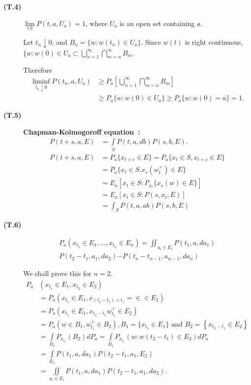 \begin{description}
\item[{\bf (T.4)}] $\lim\limits_{t\ 0} P(t, a, U_a) =1$, where $U_a$ is an
  open set containing $a$. 

Let $t_n \downarrow 0$, and $B_n = \{  w :  w (t_n) \in U_a\}$. Since
$w(t)$ is right continuous, $\{ w : w(0) \in  U_a \subset
\bigcup\limits_{n=1}^\infty \bigcap\limits_{m=n}^\infty B_m$.  

Therefore 
\begin{align*}
  \liminf\limits_{t_n \downarrow 0} P(t_n, a, U_a) & \ge P_a \left[
    \bigcup\limits^\infty_{n=1} \bigcap\limits_{m=n}^\infty B_m\right]\\
  & \ge P_a \{ w :  w(0) \in U_a\} \ge P_a \{ w : w(0) =a \} =1.
\end{align*}

\item[{\bf (T.5)}] \textbf{Chapman-Kolmogoroff equation~:}
\begin{align*}
    P(t+s, a,E) & = \int\limits_S P(t,a, db) P (s,b,E).\\
    P(t+s,a,E) &= P_a \{ x_{t+s} \in E \}= P_a \{ x_t \in S, x_{t+s} \in E \} \\
    & = P_a \{ x_t \in S. x_s (w^+_t) \in E \} \\
    &=E_a [ x_t \in S :   P_{x_t} \{  x_s (w) \in E \} ] \\
    &= E_a [x_t \in S :  P(s,x_t, E)] \\
    &= \int_S P(t,a,ab) P(s,b,E)
  \end{align*}\pageoriginale

\item[{\bf (T.6)}] 
  \begin{multline*}
    P_a ( x_{t_1} \in E_1, \ldots , x_{t_n} \in E_n)
    = \iint_{a_i \in E_{i}} P (t_1, a, da_1)\\ 
    P (t_2- t_1, a_1, da_2)
    \cdots P(t_n -t_{n-1},a_{n-1}, da_n) 
  \end{multline*}

We shall prove this for $n=2$.
\begin{align*}
  P_a & (x_{t_1} \in  E_1, x_{t_2} \in E_2)\\ 
  & = P_a (x_{t_1} \in E_1,
  x_{(t_{2} -t_1)+t_{1}}=\in \in E_2) \\
  &= P_a (x_{t_1} \in E_1, x_{t_{2}-t_1} w^+_{t_1}\in E_2)\\
  &= P_a ( w \in B_1, w^+_{t_1} \in B_2), B_1= \{  x_{t_1} \in E_1\}
  \text{ and } B_2 = \left\{ x_{t_{2}-t_1} \in E_2 \right\} \\ 
  &= \int\limits_{B_1}P_{x_{t_1}}  (B_2) dP_a = \int\limits_{B_1}
  P_{x_{t_1}} (w: w(t_2 - t_1) \in E_2) dP_a \\ 
  &= \int\limits_{E_1} P(t_1, a, da_1) P( t_2 -t_1, a_1, E_2) \\
  &= \iint\limits_{a_i \in E_{i}} P(t_1,  a, da_1) P(t_2-
  t_1, a_1, da_2). 
\end{align*}


\end{description}
